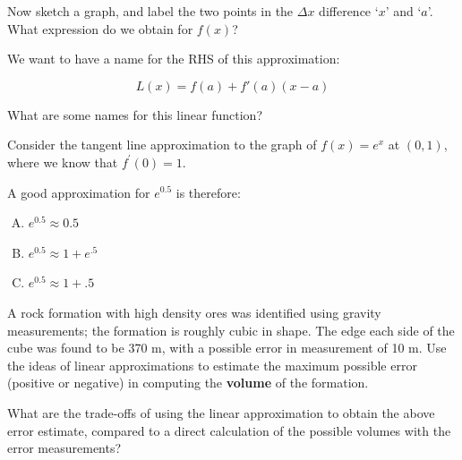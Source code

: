          Now sketch a graph, and label the two points
        in the $\Delta x$ difference `$x$' and `$a$'.  What expression
        do we obtain for $f(x)$?

\newpage
We want to have a name for the RHS of this approximation:
\begin{boxnote}
\[ L(x)=f(a) + f'(a) (x-a) 
\]
\end{boxnote}
\begin{problem}
 What are some names for this linear function?
\end{problem}


\newpage
\begin{problem}
Consider the tangent line approximation to the graph
of $f(x)=e^x$ at $(0,1)$, where we know that $f^\prime (0) = 1$. 

A good approximation for $e^{0.5}$ is therefore: \\[2ex]
\begin{enumerate}[A.]
\item $e^{0.5 }\approx 0.5$ \\[2ex]
\item $e^{0.5 }\approx 1+e^{.5}$ \\[2ex]
\item $e^{0.5 }\approx 1+.5$ \\[2ex]
\end{enumerate}

\end{problem}

\newpage
{}
\begin{problem}
  A rock formation with high density ores was identified using gravity
  measurements; the formation is roughly cubic in shape. The edge each
  side of the cube was found to be 370 m, with a possible error in
  measurement of 10 m.  Use the ideas of linear approximations to
  estimate the maximum possible error (positive or negative) in
  computing the {\bf volume} of the formation.
\end{problem}
	\vfill
	\vfill

\newpage
\problem What are the trade-offs of using the linear approximation to
obtain the above error estimate, compared to a direct calculation of
the possible volumes with the error measurements?  \vfill

\newpage

